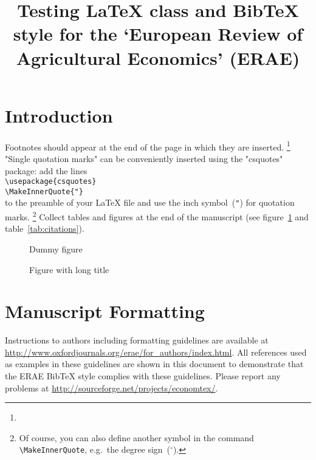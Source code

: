 \documentclass{erae}
\title{Testing \LaTeX{} class and Bib\TeX{} style for the
   `European Review of Agricultural Economics' (ERAE)}
\begin{document}
\maketitle

\begin{abstract}
\end{abstract}

\section{Introduction}

Footnotes should appear at the end of the page in which they are inserted.%
\footnote{
}
"Single quotation marks" can be conveniently inserted using
the "csquotes" package:
add the lines\\
\verb!\usepackage{csquotes}!\\
\verb!\MakeInnerQuote{"}!\\
to the preamble of your \LaTeX{} file and use the inch symbol~(\verb!"!)
for quotation marks.%
\footnote{%
Of course, you can also define another symbol in the command
\texttt{\textbackslash{}MakeInnerQuote},
e.g.\ the degree sign~($^{\circ}$).
}
Collect tables and figures at the end of the manuscript
(see figure~\ref{fig:dummy} and table~\ref{tab:citations}).

\begin{figure}[htbp]
\caption{Dummy figure}
\label{fig:dummy}
\end{figure}

\begin{figure}[htbp]
\caption{Figure with  long title}
\label{fig:long-title}
\end{figure}

\section{Manuscript Formatting}
Instructions to authors including formatting guidelines are available at
\url{http://www.oxfordjournals.org/erae/for_authors/index.html}.
All references used as examples in these guidelines are shown in this document
to demonstrate that the ERAE Bib\TeX{} style complies with these guidelines.
Please report any problems at
\url{http://sourceforge.net/projects/economtex/}.
\end{document}
